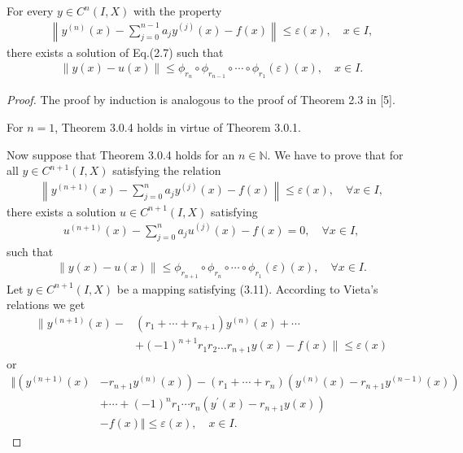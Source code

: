 \documentclass[a4paper,12pt]{report}
\begin{document}
 \begin{thm}
	For every $y \in C^{n}(I, X)$ with the property
	\begin{eqnarray}
		\left\|y^{(n)}(x)-\sum_{j=0}^{n-1} a_{j} y^{(j)}(x)-f(x)\right\| \le \varepsilon(x), \quad x \in I,
	\end{eqnarray}
there exists a solution of Eq.(2.7) such that
\begin{eqnarray}
	 \|y(x)-u(x)\| \le \phi_{r_{n}} \circ \phi_{r_{n-1}} \circ \cdots \circ \phi_{r_{1}}(\varepsilon)(x), \quad x \in I.
\end{eqnarray}
\begin{proof}
	The proof by induction is analogous to the proof of Theorem 2.3 in [5].
	
	For $n=1$, Theorem 3.0.4 holds in virtue of Theorem 3.0.1.
	
	Now suppose that Theorem 3.0.4 holds for an $n \in \mathbb{N}$. We have to prove that for all $y \in C^{n+1}(I, X)$ satisfying the relation
	\begin{eqnarray}
	\left\|y^{(n+1)}(x)-\sum_{j=0}^{n} a_{j} y^{(j)}(x)-f(x)\right\| \le \varepsilon(x), \quad \forall x \in I,
	\end{eqnarray}
there exists a solution $u \in C^{n+1}(I, X)$ satisfying
\begin{eqnarray}
	u^{(n+1)}(x)-\sum_{j=0}^{n} a_{j} u^{(j)}(x)-f(x)=0, \quad \forall x \in I,
\end{eqnarray}
such that
\begin{eqnarray}
	\|y(x)-u(x)\| \le \phi_{r_{n+1}} \circ \phi_{r_{n}} \circ \cdots \circ \phi_{r_{1}}(\varepsilon)(x), \quad \forall x \in I.
\end{eqnarray}
Let $y \in C^{n+1}(I, X)$ be a mapping satisfying (3.11). According to Vieta's relations we get 
$$
 \begin{aligned}
 	\|y^{(n+1)}(x)-&
 	\left(r_1+\cdots+r_{n+1}\right)
 	y^{(n)}(x)+\cdots\\
 	&+(-1)^{n+1}r_1r_2 \dots
 	r_{n+1}y(x)-f(x) \| \le
 	\varepsilon(x)
 \end{aligned}
$$
or
\begin{align}
		\Vert\left(y^{(n+1)}(x)\right. &
		\left.-r_{n+1}y^{(n)}(x)\right)-
		\left(r_1+\cdots+r_n\right)\left(
		y^{(n)}(x)-r_{n+1} y^{(n-1)}
		(x)\right) \nonumber\\
		&  +\cdots+(-1)^{n} r_{1} \cdots r_n\left(y^{\prime}(x)-r_{n+1} y(x)\right)\nonumber\\
		&-f(x)\Vert \le \varepsilon(x), \quad x \in I .
	\end{align}

\end{proof}
\end{thm}
\end{document}
